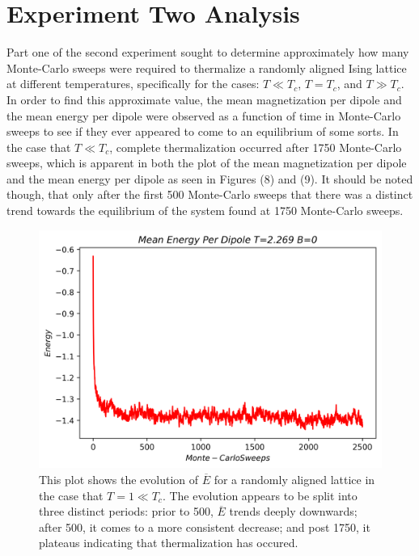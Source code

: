 \documentclass[twocolumn]{article}
\begin{document}
\section{Experiment Two Analysis}
\hspace{\parindent}Part one of the second experiment sought to determine approximately how many Monte-Carlo sweeps were required to thermalize a randomly aligned Ising lattice at different temperatures, specifically for the cases: $T \ll T_c$, $T=T_c$, and $T \gg T_c$. In order to find this approximate value, the mean magnetization per dipole and the mean energy per dipole were observed as a function of time in Monte-Carlo sweeps to see if they ever appeared to come to an equilibrium of some sorts. In the case that $T \ll T_c$, complete thermalization occurred after 1750 Monte-Carlo sweeps, which is apparent in both the plot of the mean magnetization per dipole and the mean energy per dipole as seen in Figures (8) and (9). It should be noted though, that only after the first 500 Monte-Carlo sweeps that there was a distinct trend towards the equilibrium of the system found at 1750 Monte-Carlo sweeps. \\
\begin{figure}[H]
\caption{This plot shows the evolution of $\overline{E}$ for a randomly aligned lattice in the case that $T=1 \ll T_c$. The evolution appears to be split into three distinct periods: prior to 500, $\overline{E}$ trends deeply downwards; after 500, it comes to a more consistent decrease; and post 1750, it plateaus indicating that thermalization has occured.}
\centering
\includegraphics[scale=.5]{EnergyT=2269B=0}
\end{figure}
\end{document}
